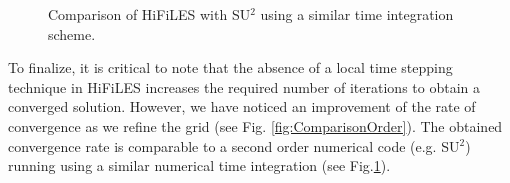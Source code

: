 \begin{figure}
\begin{center}
\begin{minipage}[t]{0.48\columnwidth}
\caption{Comparison of HiFiLES with SU$^2$ using a similar time integration scheme.}
\label{fig:Comparison_SecondOrder}
\end{minipage}
\end{center}
\end{figure}

To finalize, it is critical to note that the absence of a local time stepping technique in HiFiLES increases the required number of iterations to obtain a converged solution. However, we have noticed an improvement of the rate of convergence as we refine the grid (see Fig. \ref{fig:ComparisonOrder}). The obtained convergence rate is comparable to a second order numerical code (e.g. SU$^2$\cite{palacios13,palacios14}) running using a similar numerical time integration (see Fig.\ref{fig:Comparison_SecondOrder}).
